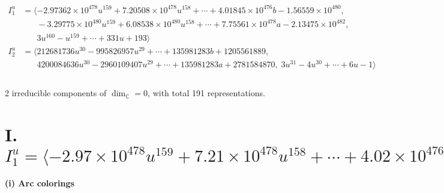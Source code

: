 \documentclass[1p]{elsarticle_modified}
\theoremstyle{definition}
\begin{document}
\begin{align*}
I^u_{1}&=\langle 
-2.97362\times10^{478} u^{159}+7.20508\times10^{478} u^{158}+\cdots+4.01845\times10^{476} b-1.56559\times10^{480},\\
\phantom{I^u_{1}}&\phantom{= \langle  }-3.29775\times10^{480} u^{159}+6.08538\times10^{480} u^{158}+\cdots+7.75561\times10^{478} a-2.13475\times10^{482},\\
\phantom{I^u_{1}}&\phantom{= \langle  }3 u^{160}- u^{159}+\cdots+331 u+193\rangle \\
I^u_{2}&=\langle 
212681736 u^{30}-995826957 u^{29}+\cdots+135981283 b+1205561889,\\
\phantom{I^u_{2}}&\phantom{= \langle  }4200084636 u^{30}-2960109407 u^{29}+\cdots+135981283 a+2781584870,\;3 u^{31}-4 u^{30}+\cdots+6 u-1\rangle \\
\\
\end{align*}
\raggedright * 2 irreducible components of $\dim_{\mathbb{C}}=0$, with total 191 representations.\\
\newpage
\renewcommand{\arraystretch}{1}
\centering \section*{I. $I^u_{1}= \langle -2.97\times10^{478} u^{159}+7.21\times10^{478} u^{158}+\cdots+4.02\times10^{476} b-1.57\times10^{480},\;-3.30\times10^{480} u^{159}+6.09\times10^{480} u^{158}+\cdots+7.76\times10^{478} a-2.13\times10^{482},\;3 u^{160}- u^{159}+\cdots+331 u+193 \rangle$}
\flushleft \textbf{(i) Arc colorings}\\
\end{document}
